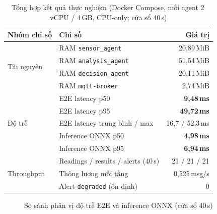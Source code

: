 \documentclass[12pt,a4paper,oneside]{report}
\begin{document}
\begin{table}[htbp]
  \centering
  \caption{Tổng hợp kết quả thực nghiệm (Docker Compose, mỗi agent 2\,vCPU / 4\,GB, CPU-only; cửa sổ 40\,s)}
  \label{tab:tong-hop-thuc-nghiem}
  \begin{tabular}{llr}
    \toprule
    \textbf{Nhóm chỉ số} & \textbf{Chỉ số} & \textbf{Giá trị} \\
    \midrule
    \multirow{4}{*}{Tài nguyên}
      & RAM \texttt{sensor\_agent} & 20,89\,MiB \\
      & RAM \texttt{analysis\_agent} & 51,54\,MiB \\
      & RAM \texttt{decision\_agent} & 20,11\,MiB \\
      & RAM \texttt{mqtt-broker} & 2,74\,MiB \\
    \midrule
    \multirow{5}{*}{Độ trễ}
      & E2E latency p50 & \textbf{9,48\,ms} \\
      & E2E latency p95 & \textbf{49,72\,ms} \\
      & E2E latency trung bình / max & 16,7 / 52,3\,ms \\
      & Inference ONNX p50 & \textbf{4,98\,ms} \\
      & Inference ONNX p95 & \textbf{6,94\,ms} \\
    \midrule
    \multirow{3}{*}{Throughput}
      & Readings / results / alerts (40\,s) & 21 / 21 / 21 \\
      & Thông lượng mỗi tầng & 0,525\,msg/s \\
      & Alert \texttt{degraded} (ổn định) & 0 \\
    \bottomrule
  \end{tabular}
\end{table}

\begin{figure}[htbp]
  \centering
  \caption{So sánh phân vị độ trễ E2E và inference ONNX (cửa sổ 40\,s)}
  \label{fig:latency-bar}
\end{figure}
\end{document}
